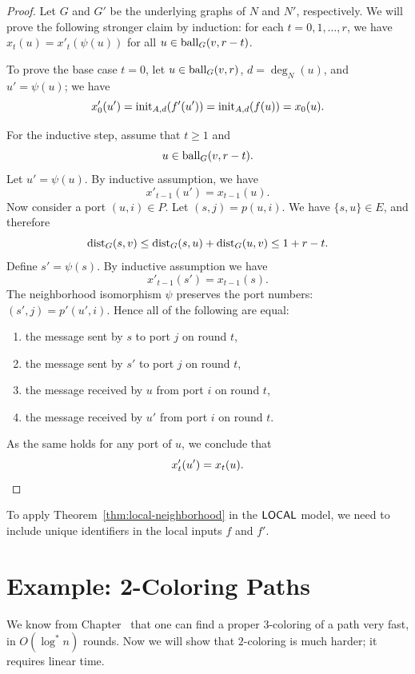 \begin{proof}
    Let $G$ and $G'$ be the underlying graphs of $N$ and $N'$, respectively. We will prove the following stronger claim by induction: for each $t = 0, 1, \dotsc, r$, we have $x_t(u) = x'_t(\psi(u))$ for all $u \in \operatorname{ball}_G(v,r-t)$.
    
    To prove the base case $t = 0$, let $u \in \operatorname{ball}_G(v,r)$, $d = \deg_N(u)$, and $u' = \psi(u)$; we have
    \[
        x'_0(u') = \operatorname{init}_{A,d}(f'(u')) = \operatorname{init}_{A,d}(f(u)) = x_0(u).
    \]
    
    For the inductive step, assume that $t \ge 1$ and \[u \in \operatorname{ball}_G(v,r-t).\] Let $u' = \psi(u)$. By inductive assumption, we have
    \[
        x'_{t-1}(u') = x_{t-1}(u).
    \]
    Now consider a port $(u,i) \in P$. Let $(s,j) = p(u,i)$. We have $\{s,u\} \in E$, and therefore
    \[
        \operatorname{dist}_G(s,v) \le \operatorname{dist}_G(s,u) + \operatorname{dist}_G(u,v) \le 1 + r-t.
    \]
    Define $s' = \psi(s)$. By inductive assumption we have
    \[
        x'_{t-1}(s') = x_{t-1}(s).
    \]
    The neighborhood isomorphism $\psi$ preserves the port numbers: $(s',j) = p'(u',i)$. Hence all of the following are equal:
    \begin{enumerate}[noitemsep]
        \item the message sent by $s$ to port $j$ on round $t$,
        \item the message sent by $s'$ to port $j$ on round $t$,
        \item the message received by $u$ from port $i$ on round $t$,
        \item the message received by $u'$ from port $i$ on round $t$.
    \end{enumerate}
    As the same holds for any port of $u$, we conclude that
    \[
        x'_t(u') = x_t(u). \qedhere
    \]
\end{proof}

To apply Theorem~\ref{thm:local-neighborhood} in the $\textup{\sffamily LOCAL}$ model, we need to include unique identifiers in the local inputs $f$ and $f'$.



\section{Example: 2-Coloring Paths}

We know from Chapter~ that one can find a proper $3$-coloring of a path very fast, in $O(\log^* n)$ rounds. Now we will show that $2$-coloring is much harder; it requires linear time.


